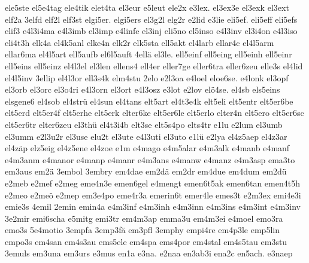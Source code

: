 {    ele5ste
    el5e4tag
    ele4tik
    elet4ta
    el3eur
    e5leut
    ele2x
    e3lex.
    el3ex3e
    el3exk
    el3ext
    elf2a
    3elfd
    elf2l
    elf3st
    elgi5er.
    elgi5ers
    el3g2l
    elg2r
    e2lid
    e3lie
    eli5ef.
    eli5eff
    eli5efs
    elif3
    e4l3i4ma
    e4l3imb
    el3imp
    e4linfe
    el3inj
    eli5no
    el5inso
    e4l3inv
    el3i4on
    e4l3iso
    eli4t3h
    elk4a
    el4k5anl
    elke4n
    elk2r
    elk5sta
    ell5akt
    el4larb
    ellar4c
    el4l5arm
    ellar6ma
    el4l5art
    ell5aufb
    el6l5auft
    4ellä
    el3le.
    ell5einf
    ell5eing
    ell5einh
    ell5einr
    ell5eins
    ell5einz
    el4l3el
    el3len
    ellens4
    ell4er
    eller7ge
    eller6tra
    eller6zeu
    elle3s
    el4lid
    el4l5inv
    3ellip
    el4l3or
    ell3s4k
    elm4stu
    2elo
    e2l3oa
    e4loel
    eloe6se.
    e4lonk
    el3opf
    el3orb
    el3orc
    el3o4ri
    e4l3orn
    el3ort
    e4l3osz
    e3lot
    e2lov
    elö4se.
    el4sb
    els5eins
    elsgene6
    el4sob
    el4strü
    el4sun
    el4tans
    elt5art
    el4t3e4k
    elt5eli
    elt5entr
    elt5er6be
    elt5erd
    elt5er4f
    elt5erhe
    elt5erk
    elter6ke
    elt5er6le
    elt5erlo
    elter4n
    elt5ero
    elt5er6sc
    elt5er6tr
    elter6zeu
    el3thü
    el4t3i4b
    elt3se
    elt5s4po
    elts4tr
    e1lu
    e2lum
    el3umb
    el3umm
    e2l3u2r
    el3use
    elu2t
    el3ute
    e4l3uti
    el3uto
    e1lü
    e2lya
    el4z5aep
    el4z3ar
    el4zäp
    elz5eig
    el4z5ene
    el4zoe
    e1m
    e4mago
    e4m5alar
    e4m3alk
    e4manb
    e4manf
    e4m3anm
    e4manor
    e4manp
    e4manr
    e4m3ans
    e4manw
    e4manz
    e4m3asp
    ema3to
    em3aus
    em2ä
    3embol
    3embry
    em4dae
    em2dä
    em2dr
    em4due
    em4dum
    em2dü
    e2meb
    e2mef
    e2meg
    eme4n3e
    emen6gel
    e4mengt
    emen6t5ak
    emen6tan
    emen4t5h
    e2meo
    e2meö
    e2mep
    em3e4po
    eme4r3a
    emerin6t
    emer4le
    emes3t
    e2m3ex
    emi4e3i
    emie3s
    4emil
    2emin
    emin4a
    e4m3inf
    e4m3inh
    e4m3inn
    e4m3ins
    e4m3int
    e4m3inv
    3e2mir
    emi6scha
    e5mitg
    emi3tr
    em4m3ap
    emma3u
    em4m3ei
    e4moel
    emo3ra
    emo3s
    5e4motio
    3empfa
    3emp3fä
    em3pfl
    3emphy
    empi4re
    em4p3le
    emp5lin
    empo3s
    em4san
    em4s3au
    ems5ele
    em4spa
    ems4por
    em4stal
    em4s5tau
    em3stu
    3emuls
    em3una
    em3urs
    e3mus
    en1a
    e3na.
    e2naa
    en3ab3i
    ena2c
    en5ach.
    e3naep
}
